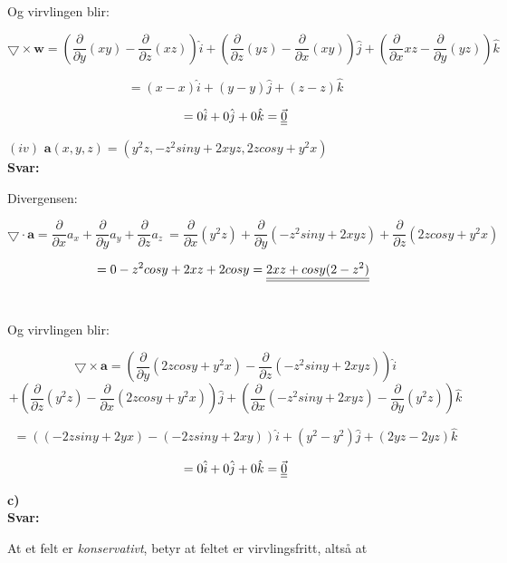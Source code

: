 \documentclass[a4paper,norsk,12pt]{article}
\begin{document}
Og virvlingen blir:

$$
\bigtriangledown \times \textbf{w} 
= \left( \frac{\partial}{\partial y} (xy) - \frac{\partial}{\partial z} (xz) \right) \hat i + \left(\frac{\partial}{\partial z} (yz) - \frac{\partial}{\partial x} (xy) \right) \hat j + \left(\frac{\partial}{\partial x} xz - \frac{\partial}{\partial y} (yz) \right) \hat k
$$

$$
=\left(x - x \right) \hat i + \left(y - y \right) \hat j + \left({z} - z \right) \hat k 
$$

$$
\def\doubleunderline#1{\underline{\underline{#1}}}
= 0 \hat i + 0 \hat j + 0\hat{k} = \doubleunderline{ \vec{0} } 
$$



$(iv)$ \hspace{3mm} $\textbf{a}(x,y,z) = (y^2 z, -z^2 sin{y} + 2xyz, 2z cos{y} + y^2 x) $ \\

\textbf{Svar:}

Divergensen:\

$$
\bigtriangledown \cdot \textbf{a} = \frac{\partial}{\partial x} a_x + \frac{\partial}{\partial y} a_y + \frac{\partial}{\partial z} a_z \  = \frac{\partial}{\partial x} (y^2z)+ \frac{\partial}{\partial y} (-z^2 siny + 2xyz) + \frac{\partial}{\partial z} (2zcosy + y^2x) \
$$ 

$$
\def\doubleunderline#1{\underline{\underline{#1}}}
= 0 - z^2cosy + 2xz + 2cosy =   \doubleunderline{ 2xz + cosy(2-z^2)} \
$$ \

Og virvlingen blir:

$$
\bigtriangledown \times \textbf{a} 
= \left( \frac{\partial}{\partial y} (2zcosy + y^2x) - \frac{\partial}{\partial z} (-z^2 siny + 2xyz) \right) \hat i 
$$
$$
+ \left(\frac{\partial}{\partial z} (y^2z) - \frac{\partial}{\partial x} (2zcosy + y^2x) \right) \hat j + \left(\frac{\partial}{\partial x} (-z^2 siny + 2xyz) - \frac{\partial}{\partial y} (y^2z) \right) \hat k
$$

$$
=\left((-2zsiny + 2yx) - (-2zsiny+2xy) \right) \hat i + \left(y^2 - y^2 \right) \hat j + \left(2yz -2yz \right) \hat k 
$$

$$
\def\doubleunderline#1{\underline{\underline{#1}}}
= 0 \hat i + 0 \hat j + 0\hat{k} = \doubleunderline{ \vec{0} } 
$$

\textbf{c)} \\

\textbf{Svar:}

At et felt er \textit{konservativt}, betyr at feltet er virvlingsfritt, altså at 
\end{document}
